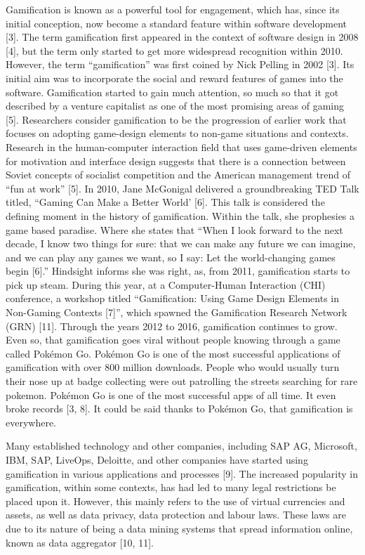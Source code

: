 \documentclass{sigchi}
\begin{document}
Gamification is known as a powerful tool for engagement, which has, since its initial conception, now become a standard feature within software development [3]. The term gamification first appeared in the context of software design in 2008 [4], but the term only started to get more widespread recognition within 2010. However, the term “gamification” was first coined by Nick Pelling in 2002 [3]. Its initial aim was to incorporate the social and reward features of games into the software. Gamification started to gain much attention, so much so that it got described by a venture capitalist as one of the most promising areas of gaming [5]. 
Researchers consider gamification to be the progression of earlier work that focuses on adopting game-design elements to non-game situations and contexts. Research in the human-computer interaction field that uses game-driven elements for motivation and interface design suggests that there is a connection between Soviet concepts of socialist competition and the American management trend of “fun at work” [5]. 
In 2010, Jane McGonigal delivered a groundbreaking TED Talk titled, “Gaming Can Make a Better World’ [6]. This talk is considered the defining moment in the history of gamification. Within the talk, she prophesies a game based paradise. Where she states that “When I look forward to the next decade, I know two things for sure: that we can make any future we can imagine, and we can play any games we want, so I say: Let the world-changing games begin [6].” Hindsight informs she was right, as, from 2011, gamification starts to pick up steam. During this year, at a Computer-Human Interaction (CHI) conference, a workshop titled “Gamification: Using Game Design Elements in Non-Gaming Contexts [7]”, which spawned the Gamification Research Network (GRN) [11]. Through the years 2012 to 2016, gamification continues to grow. Even so, that gamification goes viral without people knowing through a game called Pokémon Go. Pokémon Go is one of the most successful applications of gamification with over 800 million downloads. People who would usually turn their nose up at badge collecting were out patrolling the streets searching for rare pokemon. Pokémon Go is one of the most successful apps of all time. It even broke records [3, 8]. It could be said thanks to Pokémon Go, that gamification is everywhere. 

Many established technology and other companies, including SAP AG, Microsoft, IBM, SAP, LiveOps, Deloitte, and other companies have started using gamification in various applications and processes [9]. 
The increased popularity in gamification, within some contexts, has had led to many legal restrictions be placed upon it. However, this mainly refers to the use of virtual currencies and assets, as well as data privacy, data protection and labour laws. These laws are due to its nature of being a data mining systems that spread information online, known as data aggregator [10, 11]. 
\end{document}
